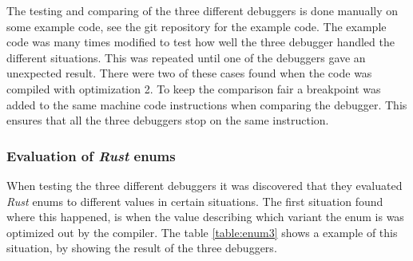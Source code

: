 


The testing and comparing of the three different debuggers is done manually on some example code, see the git repository \cite{example-code} for the example code.
The example code was many times modified to test how well the three debugger handled the different situations.
This was repeated until one of the debuggers gave an unexpected result.
There were two of these cases found when the code was compiled with optimization 2.
To keep the comparison fair a breakpoint was added to the same machine code instructions when comparing the debugger.
This ensures that all the three debuggers stop on the same instruction.


\subsubsection{Evaluation of \emph{Rust} enums}
When testing the three different debuggers it was discovered that they evaluated \emph{Rust} enums to different values in certain situations.
The first situation found where this happened, is when the value describing which variant the enum is was optimized out by the compiler.
The table \ref{table:enum3} shows a example of this situation, by showing the result of the three debuggers.

